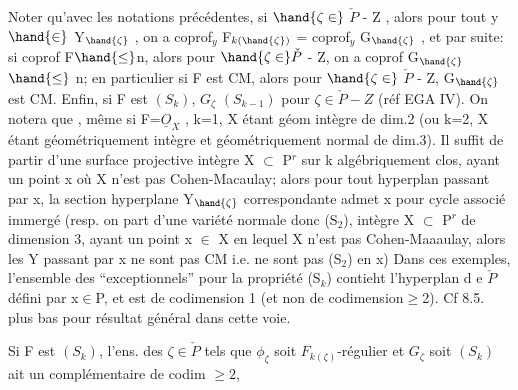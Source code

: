 
Noter qu'avec les notations précédentes, si $\hand{\zeta\in}$ $\check{P}$ - Z , alors pour tout
y $\hand{\in}$ Y$_{\hand{\zeta}}$ , on a coprof$_y$ F$_{k(\hand{\zeta})}$ = coprof$_y$ G$_{\hand{\zeta}}$ , et par suite: si coprof F$\hand{\leq}$n,
alors pour $\hand{\zeta\in}\check{P}$ - Z, on a coprof G$_{\hand{\zeta}}$ $\hand{\leq}$ n; en particulier si F est CM, alors
pour $\hand{\zeta\in}$ $\check{P}$ - Z, G$_{\hand{\zeta}}$ est CM. Enfin, si F est $(S_k)$,  $G_\zeta$ $(S_{k-1})$ pour $\zeta\in\check{P}-Z$ (réf EGA IV).
 On notera que  
, même si F=$\underline{O}_X$ , k=1, X étant géom intègre de dim.2 (ou k=2, X étant
géométriquement intègre et géométriquement normal de dim.3). Il suffit
de partir d'une surface projective  intègre X $\subset$ P$^r$ sur k algébriquement
clos, ayant un point x où X n'est pas Cohen-Macaulay; alors pour tout
hyperplan passant par x, la section hyperplane Y$_{\hand{\zeta}}$ correspondante admet
x pour cycle associé immergé (resp. on part d'une variété normale\hand{,} \hand{(}donc
(S$_2$)\hand{)}, intègre X $\subset$ P$^r$ de dimension 3, ayant un point x $\in$ X en lequel X n'est pas
Cohen-Maaaulay, alors les Y passant par x ne sont pas  CM i.e. ne sont
pas (S$_2$) en x) Dans ces exemples, l'ensemble des \hand{$\zeta$} ``exceptionnels''
pour la propriété (S$_k$) contieht l'hyperplan d e $\check{P}$ défini par x$\in$P, et est
de codimension 1 (et non de codimension$\geq$2). Cf  8.5. plus bas pour  résultat général  dans cette voie.



Si F est $(S_k)$,  l'ens. des $\zeta\in\check{P}$ tels que $\phi_\zeta$ soit $F_{k(\zeta)}$-régulier et $G_\zeta$ soit $(S_k)$ ait un complémentaire de codim $\geq 2$,

